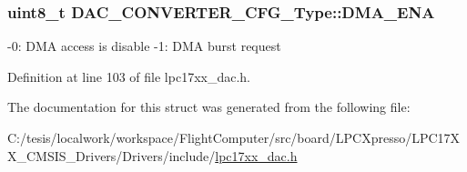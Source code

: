 \hypertarget{struct_d_a_c___c_o_n_v_e_r_t_e_r___c_f_g___type_ab7d2da673bb34b9d2ca7e55535bb7304}{
\subsubsection[{\-D\-M\-A\-\_\-\-E\-N\-A}]{\setlength{\rightskip}{0pt plus 5cm}uint8\-\_\-t {\bf \-D\-A\-C\-\_\-\-C\-O\-N\-V\-E\-R\-T\-E\-R\-\_\-\-C\-F\-G\-\_\-\-Type\-::\-D\-M\-A\-\_\-\-E\-N\-A}}}\label{struct_d_a_c___c_o_n_v_e_r_t_e_r___c_f_g___type_ab7d2da673bb34b9d2ca7e55535bb7304}
-\/0\-: \-D\-M\-A access is disable -\/1\-: \-D\-M\-A burst request 

\-Definition at line 103 of file lpc17xx\-\_\-dac.\-h.



\-The documentation for this struct was generated from the following file\-:\begin{DoxyCompactItemize}
\item 
\-C\-:/tesis/localwork/workspace/\-Flight\-Computer/src/board/\-L\-P\-C\-Xpresso/\-L\-P\-C17\-X\-X\-\_\-\-C\-M\-S\-I\-S\-\_\-\-Drivers/\-Drivers/include/\hyperlink{lpc17xx__dac_8h}{lpc17xx\-\_\-dac.\-h}\end{DoxyCompactItemize}

